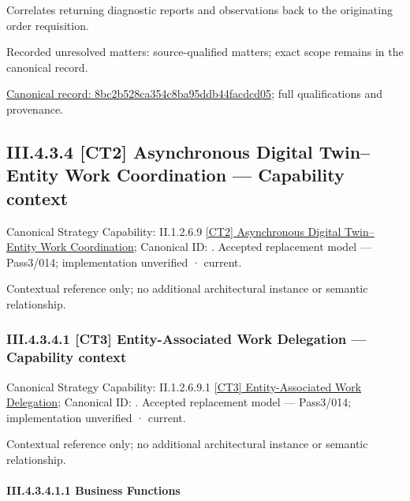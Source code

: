 Correlates returning diagnostic reports and observations back to the originating order requisition.


{\small Recorded unresolved matters: source-qualified matters; exact scope remains in the canonical record.}\par
{\footnotesize \href{../../../../../../../continuum/business/business-function/8bc2b528ca354c8ba95ddb44facdcd05.md}{Canonical record: 8bc2b528ca354c8ba95ddb44facdcd05}; full qualifications and provenance.}\par
\subsection*{III.4.3.4 [CT2] Asynchronous Digital Twin–Entity Work Coordination — Capability context}
\label{navigation:III.4.3.4}

{\small Canonical Strategy Capability: II.1.2.6.9 \hyperref[element:7a97e45e72cf468983b6ba5c79217503]{[CT2] Asynchronous Digital Twin–Entity Work Coordination}; Canonical ID: \texttt{}. Accepted replacement model — Pass3/014; implementation unverified · current.}\par
Contextual reference only; no additional architectural instance or semantic relationship.\par
\subsubsection*{III.4.3.4.1 [CT3] Entity-Associated Work Delegation — Capability context}
\label{navigation:III.4.3.4.1}

{\small Canonical Strategy Capability: II.1.2.6.9.1 \hyperref[element:54b2f346a08c49a98ed9b3d64b2f877e]{[CT3] Entity-Associated Work Delegation}; Canonical ID: \texttt{}. Accepted replacement model — Pass3/014; implementation unverified · current.}\par
Contextual reference only; no additional architectural instance or semantic relationship.\par
\paragraph*{III.4.3.4.1.1 Business Functions}
\label{navigation:III.4.3.4.1.1}

